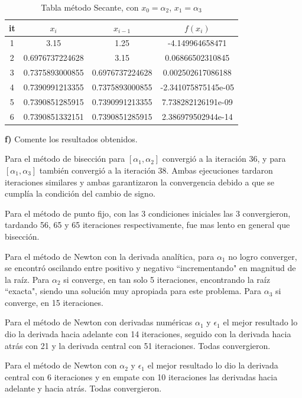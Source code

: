 \documentclass{article} %
\begin{document}
\begin{table}[H]
\centering
\begin{tabular}{|c|c|c|c|}
\hline
it & $x_i$ & $x_{i-1}$ & $f(x_i)$\\
\hline
1 & 3.15 & 1.25 & -4.149964658471\\
2 & 0.6976737224628 & 3.15 & 0.06866502310845\\
3 & 0.7375893000855 & 0.6976737224628 & 0.002502617086188\\
4 & 0.7390991213355 & 0.7375893000855 & -2.341075875145e-05\\
5 & 0.7390851285915 & 0.7390991213355 & 7.738282126191e-09\\
6 & 0.7390851332151 & 0.7390851285915 & 2.386979502944e-14\\
\hline
\end{tabular}
\caption{Tabla método Secante, con $x_0 = \alpha_2$, $x_1 = \alpha_3$}
\end{table}

\textbf{f)} Comente los resultados obtenidos.

Para el método de bisección para $[\alpha_1,\alpha_2]$ convergió a la iteración 36, y para $[\alpha_1,\alpha_3]$ también convergió a la iteración 38. Ambas ejecuciones tardaron iteraciones similares y ambas garantizaron la convergencia debido a que se cumplía la condición del cambio de signo.

Para el método de punto fijo, con las 3 condiciones iniciales las 3 convergieron, tardando 56, 65 y 65 iteraciones respectivamente, fue mas lento en general que bisección.

Para el método de Newton con la derivada analítica, para $\alpha_1$ no logro converger, se encontró oscilando entre positivo y negativo ``incrementando" en magnitud de la raíz. Para $\alpha_2$ si converge, en tan solo 5 iteraciones, encontrando la raíz ``exacta", siendo una solución muy apropiada para este problema. Para $\alpha_3$ si converge, en 15 iteraciones.

Para el método de Newton con derivadas numéricas $\alpha_1$ y $\epsilon_1$ el mejor resultado lo dio la derivada hacia adelante con 14 iteraciones, seguido con la derivada hacia atrás con 21 y la derivada central con 51 iteraciones. Todas convergieron.

Para el método de Newton con $\alpha_2$ y $\epsilon_1$ el mejor resultado lo dio la derivada central con 6 iteraciones y en empate con 10 iteraciones las derivadas hacia adelante y hacia atrás. Todas convergieron.
\end{document}
